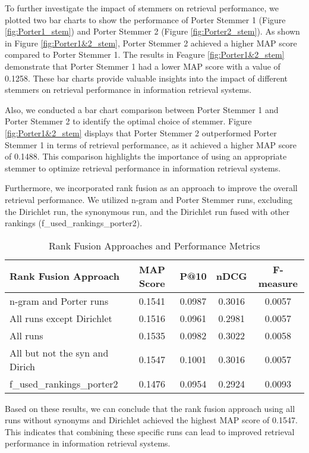 To further investigate the impact of stemmers on retrieval performance, we plotted two bar charts to show the performance of Porter Stemmer 1 (Figure \ref{fig:Porter1_stem}) and Porter Stemmer 2 (Figure \ref{fig:Porter2_stem}). As shown in Figure \ref{fig:Porter1&2_stem}, Porter Stemmer 2 achieved a higher MAP score compared to Porter Stemmer 1. The results in Feagure \ref{fig:Porter1&2_stem} demonstrate that Porter Stemmer 1 had a lower MAP score with a value of 0.1258. These bar charts provide valuable insights into the impact of different stemmers on retrieval performance in information retrieval systems.

Also, we conducted a bar chart comparison between Porter Stemmer 1 and Porter Stemmer 2 to identify the optimal choice of stemmer. Figure \ref{fig:Porter1&2_stem} displays that Porter Stemmer 2 outperformed Porter Stemmer 1 in terms of retrieval performance, as it achieved a higher MAP score of 0.1488. This comparison highlights the importance of using an appropriate stemmer to optimize retrieval performance in information retrieval systems.

Furthermore, we incorporated rank fusion as an approach to improve the overall retrieval performance. We utilized n-gram and Porter Stemmer runs, excluding the Dirichlet run, the synonymous run, and the Dirichlet run fused with other rankings (f\_used\_rankings\_porter2). 

\begin{table}[h]
\centering
\caption{Rank Fusion Approaches and Performance Metrics}
\begin{tabular}{|l|c|c|c|c|}
\hline
\textbf{Rank Fusion Approach} & \textbf{MAP Score} & \textbf{P@10} & \textbf{nDCG} & \textbf{F-measure} \\
\hline
n-gram and Porter runs & 0.1541 & 0.0987 & 0.3016 & 0.0057 \\
All runs except Dirichlet & 0.1516 & 0.0961 & 0.2981 & 0.0057 \\
All runs & 0.1535 & 0.0982 & 0.3022 & 0.0058 \\
All but not the syn and Dirich & 0.1547 & 0.1001 & 0.3016 & 0.0057 \\
f\_used\_rankings\_porter2 & 0.1476 & 0.0954 & 0.2924 & 0.0093 \\
\hline
\end{tabular}
\end{table}

Based on these results, we can conclude that the rank fusion approach using all runs without synonyms and Dirichlet achieved the highest MAP score of 0.1547. This indicates that combining these specific runs can lead to improved retrieval performance in information retrieval systems.

